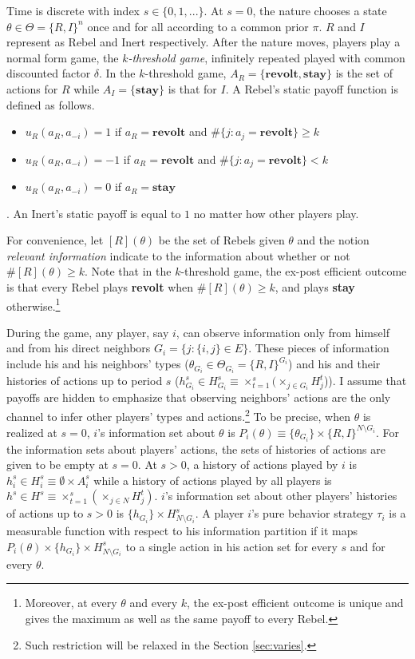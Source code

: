 \documentclass[12pt,letter]{article}
\theoremstyle{definition}
\theoremstyle{remark}
\theoremstyle{claim}
\begin{document}
Time is discrete with index $s\in\{0,1,...\}$. At $s=0$, the nature chooses a state $\theta\in \Theta=\{R,I\}^n$ once and for all according to a common prior $\pi$. $R$ and $I$ represent as Rebel and Inert respectively. After the nature moves, players play a normal form game, the \textit{$k$-threshold game}, infinitely repeated played with common discounted factor $\delta$. In the $k$-threshold game, $A_R=\{\textbf{revolt}, \textbf{stay}\}$ is the set of actions for $R$ while $A_I=\{\textbf{stay}\}$ is that for $I$. A Rebel's static payoff function is defined as follows. 
\begin{itemize}
\item $u_{R}(a_{R},a_{-i})=1$ if $a_{R}=\textbf{revolt}$ and $\#\{j:a_{j}=\textbf{revolt}\}\geq k$
\item $u_{R}(a_{R},a_{-i})=-1$ if $a_{R}=\textbf{revolt}$ and $\#\{j:a_{j}=\textbf{revolt}\}< k$
\item $u_{R}(a_{R},a_{-i})=0$ if $a_{R}=\textbf{stay}$
\end{itemize}
. An Inert's static payoff is equal to $1$ no matter how other players play. 

For convenience, let $[R](\theta)$ be the set of Rebels given $\theta$ and the notion \textit{relevant information} indicate to the information about whether or not $\#[R](\theta)\geq k$. Note that in the $k$-threshold game, the ex-post efficient outcome is that every Rebel plays \textbf{revolt} when $\#[R](\theta)\geq k$, and plays \textbf{stay} otherwise.\footnote{Moreover, at every $\theta$ and every $k$, the ex-post efficient outcome is unique and gives the maximum as well as the same payoff to every Rebel.} 

During the game, any player, say $i$, can observe information only from himself and from his direct neighbors $G_i=\{j:\{i,j\}\in E\}$. These pieces of information include his and his neighbors' types ($\theta_{G_i}\in \Theta_{G_i}=\{R,I\}^{G_i}$) and his and their histories of actions up to period $s$ ($h^s_{G_i}\in H^s_{G_i}\equiv\times^s_{t=1}(\times_{j\in G_i}H^t_j$)). I assume that payoffs are hidden to emphasize that observing neighbors' actions are the only channel to infer other players' types and actions.\footnote{Such restriction will be relaxed in the Section \ref{sec:varies}.} 
To be precise, when $\theta$ is realized at $s=0$, $i$'s information set about $\theta$ is $P_{i}(\theta)\equiv\{\theta_{G_i}\}\times \{R,I\}^{N\setminus G_i}$. For the information sets about players' actions, the sets of histories of actions are given to be empty at $s=0$. At $s>0$, a history of actions played by $i$ is $h^s_i\in H^s_{i}\equiv\emptyset\times A^s_i$ while a history of actions played by all players is $h^s\in H^s\equiv\times^s_{t=1}(\times_{j\in N}H^t_j)$. $i$'s information set about other players' histories of actions up to $s>0$ is $\{h_{G_i}\}\times H^s_{N\setminus G_i}$. A player $i$'s pure behavior strategy $\tau_{i}$ is a measurable function with respect to his information partition if it maps $P_i(\theta)\times \{h_{G_i}\}\times H^s_{N\setminus G_i}$ to a single action in his action set for every $s$ and for every $\theta$. 
\end{document}
